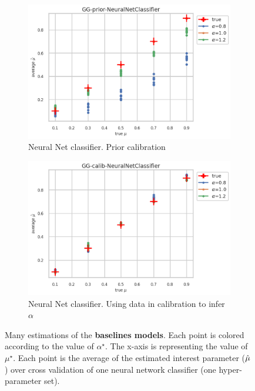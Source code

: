 \begin{figure}[ht!]
  \begin{subfigure}[t]{0.49\linewidth}
    \includegraphics[width=\linewidth]{COMPARE/GG-prior/NeuralNetClassifier/profusion_true_mu_target_mean.png}
    \caption{Neural Net classifier. Prior calibration}
  \end{subfigure}%
  \hfill
  \begin{subfigure}[t]{0.49\linewidth}
    \includegraphics[width=\linewidth]{COMPARE/GG-calib/NeuralNetClassifier/profusion_true_mu_target_mean.png}
    \caption{Neural Net classifier. Using data in calibration to infer $\alpha$}
  \end{subfigure}

  \caption{Many estimations of the \textbf{baselines models}. Each point is colored according to the value of $\alpha^\star$. The x-axis is representing the value of $\mu^\star$. Each point is the average of the estimated interest parameter ($\hat\mu$) over cross validation of one neural network classifier (one hyper-parameter set).}
  \label{fig:gg_baseline_compare_calib_estimator}
\end{figure}

